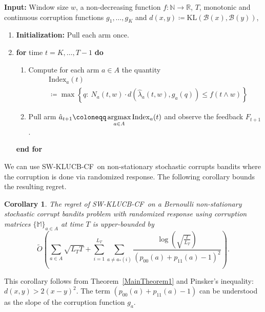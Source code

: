\documentclass[letterpaper]{article} %
\newcommand{\ArmAt}{\hat{a}}
\newcommand{\defined}{\coloneqq}
\newcommand{\SWKLUCBCF}{\textsc{SW-KLUCB-CF}}
\newcommand{\cB}{\mathcal{B}}
\newcommand{\optArmAtIChanges}[1]{a_{*}(#1)}
\newcommand{\numChanges}{L}
\newcommand{\windowsize}{w}
\newcounter{counterCorollary}
\newtheorem{myCorollary}[counterCorollary]{Corollary}
\begin{document}
\begin{algorithm}[t]
{\caption{Sliding Window KLUCB \ for Non-Stationary Stochastic Corrupt Bandits  (\SWKLUCBCF)}}%
\label{algo:SWKLUCBCF}%
{
\begin{flushleft}
\textbf{Input:}
Window size $\windowsize$,
a non-decreasing function $f:\mathds{N} \rightarrow \mathds{R}$, $T$,  monotonic and continuous corruption functions $g_1, \dots, g_K$ and $d(x,y) \defined \mathrm{KL}(\cB(x),\cB(y))$,
\end{flushleft}
\begin{enumerate}
\item \textbf{Initialization:} Pull each arm once.
\item \textbf{for} time $t = K, \dots, T-1$ \textbf{do}
\begin{enumerate}
\item Compute for each arm $a \in A$ the quantity
\begin{align*}
&
\mathrm{Index}_a(t) \\
& \defined  \max
\left\{ q:\  N_a(t, \windowsize)\cdot{}d(\hat{\lambda}_a(t, \windowsize ), g_a(q)) \leq f\left( t \wedge \windowsize\right)\right\}
\end{align*}
\item Pull arm $\ArmAt_{t+1} \defined \operatornamewithlimits{argmax}\limits_{a \in A} {\operatorname{Index}_a(t)}$ and observe the feedback $F_{t+1}$.
\end{enumerate}
\textbf{end for}
\end{enumerate}
}
\end{algorithm}

We can use \SWKLUCBCF \ on non-stationary stochastic corrupts bandits where the corruption is done via randomized response. The following corollary bounds the resulting regret.
\begin{myCorollary}
\label{UB_corollary}
The regret of \SWKLUCBCF \ on a Bernoulli non-stationary stochastic corrupt bandits problem with randomized response using corruption matrices $\{\mathds{M}\}_{a \in A}$ at time $T$ is upper-bounded by
$$
\tilde{O}\left( \sum_{a \in A} \sqrt{\numChanges_T T} + \sum_{i=1}^{\numChanges_T} \sum_{a \neq \optArmAtIChanges{i}} \frac{\log{\left(  \sqrt{ \frac{T}{\numChanges_T}} \right)}}{(p_{00}(a) + p_{11}(a)-1)^2} \right).
$$
\end{myCorollary}
\noindent
This corollary follows from Theorem~\ref{MainTheorem1} and Pinsker's inequality: $d(x,y) > 2(x-y)^2$.
The term $(p_{00}(a) + p_{11}(a) -1)$ can be understood as the slope of the corruption function $g_a$.
\end{document}
